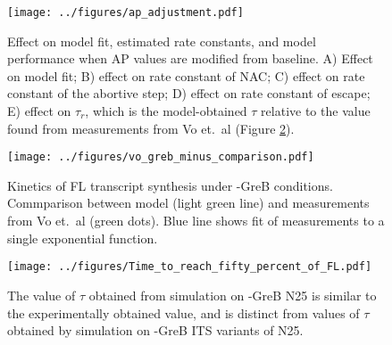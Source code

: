\begin{figure}
    \begin{center}
      \texttt{[image: ../figures/ap\_adjustment.pdf]}
    \end{center}
    \caption{Effect on model fit, estimated rate constants, and model
      performance when AP values are modified from baseline. A) Effect on
      model fit; B) effect on rate constant of NAC; C) effect on rate constant of
      the abortive step; D) effect on rate constant of escape; E) effect on
      $\tau_r$, which is the model-obtained $\tau$ relative to the value found from
      measurements from Vo et.\ al \cite{vo_vitro_2003-1} (Figure
      \ref{fig:vo_comparison}).}
\label{fig:ap_adjustment}
\end{figure}


\begin{figure}
    \begin{center}
        \texttt{[image: ../figures/vo\_greb\_minus\_comparison.pdf]}
    \end{center}
    \caption{Kinetics of FL transcript synthesis under -GreB conditions.
      Commparison between model (light green line) and measurements from Vo
      et.\ al \cite{vo_vitro_2003-1} (green dots). Blue line shows fit of
      measurements to a single exponential function.}
\label{fig:vo_comparison}
\end{figure}


\begin{figure}
    \begin{center}
      \texttt{[image: ../figures/Time\_to\_reach\_fifty\_percent\_of\_FL.pdf]}
    \end{center}
    \caption{The value of $\tau$ obtained from simulation on -GreB N25 is
      similar to the experimentally obtained value, and is distinct from
      values of $\tau$ obtained by simulation on -GreB ITS variants of N25.}
\label{fig:its_variant_fl_comparison}
\end{figure}



